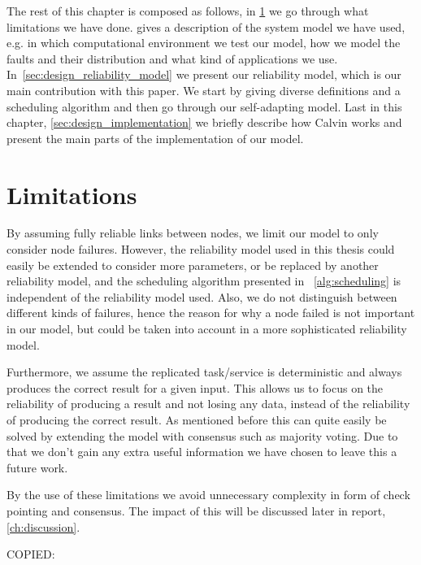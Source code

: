 \documentclass{cslthse-msc}
\begin{document}
The rest of this chapter is composed as follows, in \cref{sec:design_limitations} we go through what limitations we have done.  gives a description of the system model we have used, e.g. in which computational environment we test our model, how we model the faults and their distribution and what kind of applications we use. In~\cref{sec:design_reliability_model} we present our reliability model, which is our main contribution with this paper. We start by giving diverse definitions and a scheduling algorithm and then go through our self-adapting model. Last in this chapter, \cref{sec:design_implementation} we briefly describe how Calvin works and present the main parts of the implementation of our model.

\section{Limitations} \label{sec:design_limitations}
By assuming fully reliable links between nodes, we limit our model to only consider node failures. However, the reliability model used in this thesis could easily be extended to consider more parameters, or be replaced by another reliability model, and the scheduling algorithm presented in ~\cref{alg:scheduling} is independent of the reliability model used. Also, we do not distinguish between different kinds of failures, hence the reason for why a node failed is not important in our model, but could be taken into account in a more sophisticated reliability model.

Furthermore, we assume the replicated task/service is deterministic and always produces the correct result for a given input. This allows us to focus on the reliability of producing a result and not losing any data, instead of the reliability of producing the correct result. As mentioned before this can quite easily be solved by extending the model with consensus such as majority voting. Due to that we don't gain any extra useful information we have chosen to leave this a future work.

By the use of these limitations we avoid unnecessary complexity in form of check pointing and consensus. The impact of this will be discussed later in report, \cref{ch:discussion}.

\iffalse
COPIED:
\end{document}
